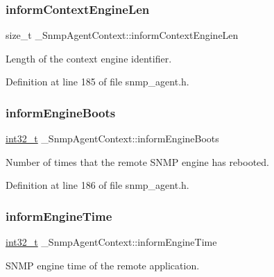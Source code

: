 \subsubsection{\texorpdfstring{inform\+Context\+Engine\+Len}{informContextEngineLen}}
{\footnotesize\ttfamily size\+\_\+t \+\_\+\+Snmp\+Agent\+Context\+::inform\+Context\+Engine\+Len}



Length of the context engine identifier. 



Definition at line 185 of file snmp\+\_\+agent.\+h.

\mbox{\label{struct__SnmpAgentContext_af3dbc1c2b661944074c7581104238eae}} 
\subsubsection{\texorpdfstring{inform\+Engine\+Boots}{informEngineBoots}}
{\footnotesize\ttfamily \hyperlink{stdint_8h_ab1967d8591af1a4e48c37fd2b0f184d0}{int32\+\_\+t} \+\_\+\+Snmp\+Agent\+Context\+::inform\+Engine\+Boots}



Number of times that the remote S\+N\+MP engine has rebooted. 



Definition at line 186 of file snmp\+\_\+agent.\+h.

\mbox{\label{struct__SnmpAgentContext_aeba98b72a275158e35dca8f0b46620f1}} 
\subsubsection{\texorpdfstring{inform\+Engine\+Time}{informEngineTime}}
{\footnotesize\ttfamily \hyperlink{stdint_8h_ab1967d8591af1a4e48c37fd2b0f184d0}{int32\+\_\+t} \+\_\+\+Snmp\+Agent\+Context\+::inform\+Engine\+Time}



S\+N\+MP engine time of the remote application. 



